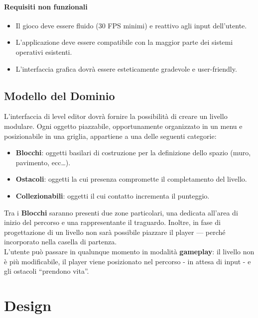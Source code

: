 \documentclass[a4paper,12pt]{report}
\begin{document}
\subsubsection{Requisiti non funzionali}
\begin{itemize}
	\item Il gioco deve essere fluido (30 FPS minimi) e reattivo agli input dell'utente.
	\item L'applicazione deve essere compatibile con la maggior parte dei sistemi operativi esistenti.
	\item L'interfaccia grafica dovrà essere esteticamente gradevole e user-friendly.
\end{itemize}

\section{Modello del Dominio}
L'interfaccia di level editor dovrà fornire la possibilità di creare un livello modulare. Ogni oggetto piazzabile, opportunamente organizzato in un menu e posizionabile in una griglia, appartiene a una delle seguenti categorie:
%
\begin{itemize}
	\item \textbf{Blocchi}: oggetti basilari di costruzione per la definizione dello spazio (muro, pavimento, ecc…).
	\item \textbf{Ostacoli}: oggetti la cui presenza compromette il completamento del livello.
	\item \textbf{Collezionabili}: oggetti il cui contatto incrementa il punteggio.
\end{itemize}
%
Tra i \textbf{Blocchi} saranno presenti due zone particolari, una dedicata all'area di inizio del percorso e una rappresentante il traguardo. Inoltre, in fase di progettazione di un livello non sarà possibile piazzare il player — perché incorporato nella casella di partenza. \\
%
L'utente può passare in qualunque momento in modalità \textbf{gameplay}: il livello non è più modificabile, il player viene posizionato nel percorso - in attesa di input - e gli ostacoli “prendono vita”. 
%

\chapter{Design}
\end{document}
